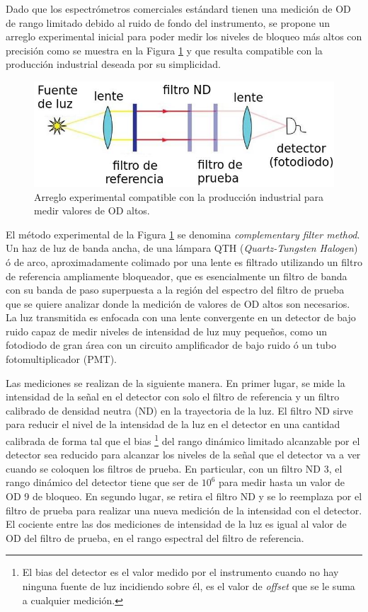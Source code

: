 \documentclass{ctuthesis}
\begin{document}
Dado que los espectrómetros 
comerciales estándard tienen una medición de OD de rango limitado debido al 
ruido de fondo del instrumento, se propone un arreglo experimental inicial para 
poder medir los niveles de bloqueo más altos con precisión como se muestra en 
la Figura \ref{fig:su} y que resulta compatible con la producción industrial 
deseada por su simplicidad.


\begin{figure}[h!]
	\centering
	\includegraphics[scale=1.0]{Figs/plan_de_tesis/setup_u.jpeg}
	\caption{Arreglo experimental compatible con la producción industrial para 
	medir valores de 
	OD altos.}
	\label{fig:su}
\end{figure}

El método experimental de la Figura \ref{fig:su} se denomina 
\textit{complementary filter method}. Un haz de 
luz de banda ancha, de una lámpara QTH 
(\textit{Quartz-Tungsten Halogen}) ó de arco, aproximadamente colimado por una 
lente  es filtrado utilizando un filtro 
de referencia ampliamente bloqueador, que es esencialmente un filtro de banda 
con su banda de paso superpuesta a la región del espectro del filtro de prueba 
que se quiere analizar donde la medición de valores de OD altos son necesarios. 
La luz transmitida es enfocada con una lente convergente en un detector de bajo 
ruido capaz de medir niveles de intensidad de luz muy pequeños, como un 
fotodiodo de gran área con un circuito amplificador de bajo ruido ó un tubo 
fotomultiplicador (PMT).


Las mediciones se realizan de la siguiente manera. En primer lugar, se mide la 
intensidad de la señal en el detector con solo el filtro de referencia y un 
filtro calibrado de densidad neutra (ND) en la trayectoria de la luz. El filtro 
ND sirve para reducir el nivel de la intensidad de la luz en el detector en 
una cantidad calibrada de forma tal que el bias \footnote{El bias del 
detector es el valor medido por el instrumento cuando no hay ninguna fuente 
de luz incidiendo sobre él, es el valor de \textit{offset} que se le suma a 
cualquier 
medición.} del rango 
dinámico limitado alcanzable por el detector sea reducido para alcanzar los 
niveles de la señal que el detector va a ver cuando se coloquen los filtros de 
prueba. En particular, con un filtro ND 3, el rango dinámico del detector tiene 
que ser de $10^{6}$ para medir hasta un valor de OD 9 de bloqueo. En segundo 
lugar, se retira el filtro ND y se lo reemplaza por el filtro de prueba para 
realizar una nueva medición de la intensidad con el detector. El cociente entre 
las dos mediciones de intensidad de la luz es igual al valor de OD del filtro 
de prueba, en el rango espectral del filtro de referencia.
\end{document}
